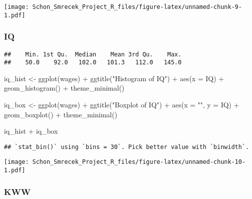 \documentclass[
]{article}
\newenvironment{Shaded}{\begin{snugshade}}{\end{snugshade}}
\newcommand{\AttributeTok}[1]{\textcolor[rgb]{0.77,0.63,0.00}{#1}}
\newcommand{\FunctionTok}[1]{\textcolor[rgb]{0.00,0.00,0.00}{#1}}
\newcommand{\NormalTok}[1]{#1}
\newcommand{\OtherTok}[1]{\textcolor[rgb]{0.56,0.35,0.01}{#1}}
\newcommand{\SpecialCharTok}[1]{\textcolor[rgb]{0.00,0.00,0.00}{#1}}
\newcommand{\StringTok}[1]{\textcolor[rgb]{0.31,0.60,0.02}{#1}}
\begin{document}
\texttt{[image: Schon\_Smrecek\_Project\_R\_files/figure-latex/unnamed-chunk-9-1.pdf]}

\hypertarget{iq}{%
\subsubsection{IQ}\label{iq}}

\begin{Shaded}
\end{Shaded}

\begin{verbatim}
##    Min. 1st Qu.  Median    Mean 3rd Qu.    Max. 
##    50.0    92.0   102.0   101.3   112.0   145.0
\end{verbatim}

\begin{Shaded}
\begin{Highlighting}[]
\NormalTok{iq\_hist }\OtherTok{\textless{}{-}} \FunctionTok{ggplot}\NormalTok{(wages) }\SpecialCharTok{+} \FunctionTok{ggtitle}\NormalTok{(}\StringTok{"Histogram of IQ"}\NormalTok{) }\SpecialCharTok{+} \FunctionTok{aes}\NormalTok{(}\AttributeTok{x =}\NormalTok{ IQ) }\SpecialCharTok{+} \FunctionTok{geom\_histogram}\NormalTok{() }\SpecialCharTok{+} \FunctionTok{theme\_minimal}\NormalTok{()}

\NormalTok{iq\_box }\OtherTok{\textless{}{-}} \FunctionTok{ggplot}\NormalTok{(wages) }\SpecialCharTok{+} \FunctionTok{ggtitle}\NormalTok{(}\StringTok{"Boxplot of IQ"}\NormalTok{) }\SpecialCharTok{+} \FunctionTok{aes}\NormalTok{(}\AttributeTok{x =} \StringTok{""}\NormalTok{, }\AttributeTok{y =}\NormalTok{ IQ) }\SpecialCharTok{+} \FunctionTok{geom\_boxplot}\NormalTok{() }\SpecialCharTok{+} \FunctionTok{theme\_minimal}\NormalTok{()}

\NormalTok{iq\_hist }\SpecialCharTok{+}\NormalTok{ iq\_box}
\end{Highlighting}
\end{Shaded}

\begin{verbatim}
## `stat_bin()` using `bins = 30`. Pick better value with `binwidth`.
\end{verbatim}

\texttt{[image: Schon\_Smrecek\_Project\_R\_files/figure-latex/unnamed-chunk-10-1.pdf]}

\hypertarget{kww}{%
\subsubsection{KWW}\label{kww}}
\end{document}
